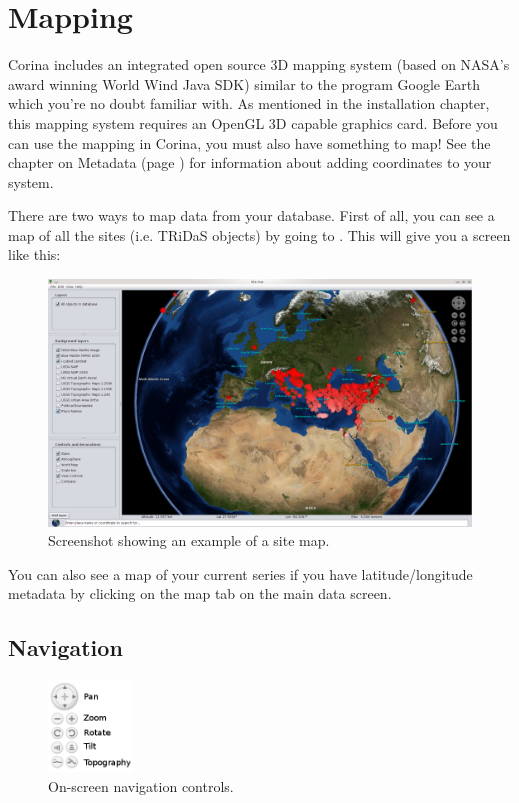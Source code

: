 \chapter{Mapping}
Corina includes an integrated open source 3D mapping system (based on NASA's award winning World Wind Java SDK) similar to the program Google Earth which you're no doubt familiar with. As mentioned in the installation chapter, this mapping system requires an OpenGL 3D capable graphics card. Before you can use the mapping in Corina, you must also have something to map! See the chapter on Metadata (page \pageref{txt:metadata}) for information about adding coordinates to your system.

There are two ways to map data from your database. First of all, you can see a map of all the sites (i.e. TRiDaS objects) by going to . This will give you a screen like this:

\begin{figure}[hbtp]
  \label{fig:map}
  \centering
  \includegraphics[width=\textwidth]{Images/sitemap.png}
  \caption{Screenshot showing an example of a site map.}
\end{figure}


You can also see a map of your current series if you have latitude/longitude metadata by clicking on the map tab on the main data screen.  
\newpage

\section{Navigation}
\begin{figure}[hbtp]
  \label{fig:wwjcontrols}
  \centering
  \includegraphics[width=0.2\textwidth]{Images/wwjcontrols.png}
  \caption{On-screen navigation controls.}
\end{figure}

